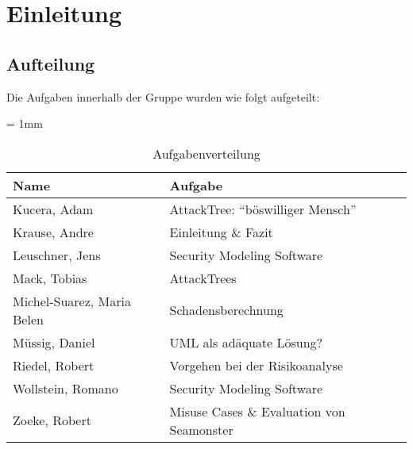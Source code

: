 \section{Einleitung}


\subsection{Aufteilung}
Die Aufgaben innerhalb der Gruppe wurden wie folgt aufgeteilt:

\begin{table}[H]
	\sffamily
	\caption{Aufgabenverteilung}
	\tabulinesep = 1mm %
	\centering
		\begin{tabu} to 0.9\textwidth { X[1.5]  X[3] }
		\hline
		\textbf{Name} & \textbf{Aufgabe}\\
		\hline 
		Kucera, Adam & AttackTree: "`böswilliger Mensch"'\\

		Krause, Andre & Einleitung \& Fazit\\

		Leuschner, Jens & Security Modeling Software\\

		Mack, Tobias & AttackTrees\\

		Michel-Suarez, Maria Belen & Schadensberechnung\\

		Müssig, Daniel & UML als adäquate Lösung?\\

		Riedel, Robert & Vorgehen bei der Risikoanalyse\\

		Wollstein, Romano & Security Modeling Software\\

		Zoeke, Robert & Misuse Cases \& Evaluation von Seamonster\\

	\end{tabu}
\end{table}
